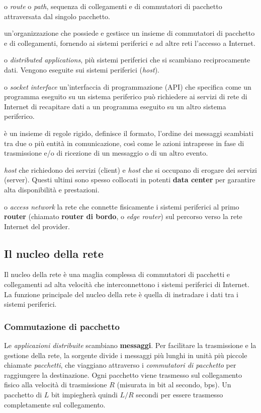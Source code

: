 \begin{description}[font=\sffamily\bfseries, leftmargin=1cm, style=nextline]
  \item[percorso]
    o \textit{route} o \textit{path}, sequenza di collegamenti e di commutatori di pacchetto attraversata dal singolo pacchetto. 
  \item[Internet ServiceProvider (ISP)]
    un'organizzazione che possiede e gestisce un insieme di commutatori di pacchetto e di collegamenti, fornendo ai sistemi periferici e ad altre reti l'accesso a Internet.
  \item[applicazioni distribuite]
    o \textit{distributed applications}, più sistemi periferici che si scambiano reciprocamente dati. Vengono eseguite sui sistemi periferici (\textit{host}).
  \item[interfaccia socket]
    o \textit{socket interface} un'interfaccia di programmazione (API) che specifica come un programma eseguito su un sistema periferico può richiedere ai servizi di rete di Internet di recapitare dati a un programma eseguito su un altro sistema periferico.
  \item[protocollo]
    è un insieme di regole rigido, definisce il formato, l’ordine dei messaggi scambiati tra due o più entità in comunicazione, così come le azioni intraprese in fase di trasmissione e/o di ricezione di un messaggio o di un altro evento.
  \item[client e server]
    \textit{host} che richiedono dei servizi (client) e \textit{host} che si occupano di erogare dei servizi (server). Questi ultimi sono spesso collocati in potenti \textbf{data center} per garantire alta disponibilità e prestazioni. 
  \item[reti di accesso]
    o \textit{access network} la rete che connette fisicamente i sistemi periferici al primo \textbf{router} (chiamato \textbf{router di bordo}, o \textit{edge router}) sul percorso verso la rete Internet del provider. 
\end{description}

\subsection{Il nucleo della rete}
Il nucleo della rete è una maglia complessa di commutatori di pacchetti e collegamenti ad alta velocità che interconnettono i sistemi periferici di Internet. La funzione principale del nucleo della rete è quella di instradare i dati tra i sistemi periferici.

\subsubsection{Commutazione di pacchetto}
Le \textit{applicazioni distribuite} scambiano \textbf{messaggi}. Per facilitare la trasmissione e la gestione della rete, la sorgente divide i messaggi più lunghi in unità più piccole chiamate \textit{pacchetti}, che viaggiano attraverso i \textit{commutatori di pacchetto} per raggiungere la destinazione. Ogni pacchetto viene trasmesso sul collegamento fisico alla velocità di trasmissione $R$ (misurata in bit al secondo, bps). Un pacchetto di $L$ bit impiegherà quindi $L/R$ secondi per essere trasmesso completamente sul collegamento.

